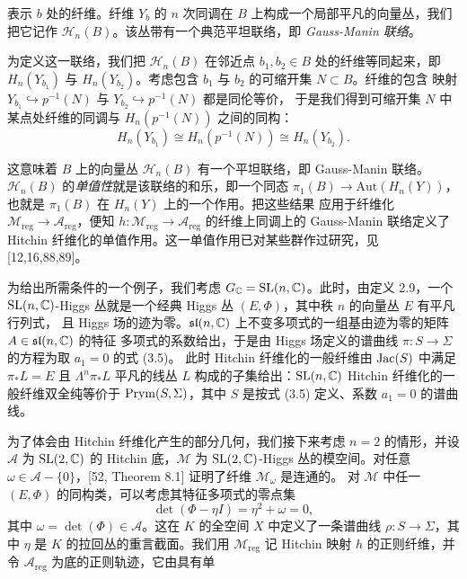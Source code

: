 
表示 $b$ 处的纤维。纤维 $Y_b$ 的 $n$ 次同调在 $B$ 上构成一个局部平凡的向量丛，我们把它记作
$\mathcal{H}_n(B)$。该丛带有一个典范平坦联络，即 \emph{Gauss-Manin 联络}。

为定义这一联络，我们把 $\mathcal{H}_n(B)$ 在邻近点 $b_1,b_2\in B$ 处的纤维等同起来，即
$H_n(Y_{b_1})$ 与 $H_n(Y_{b_2})$。考虑包含 $b_1$ 与 $b_2$ 的可缩开集 $N\subset B$。纤维的包含
映射 $Y_{b_1}\hookrightarrow p^{-1}(N)$ 与 $Y_{b_2}\hookrightarrow p^{-1}(N)$ 都是同伦等价，
于是我们得到可缩开集 $N$ 中某点处纤维的同调与 $H_n(p^{-1}(N))$ 之间的同构：
\[
H_n(Y_{b_1})\cong H_n(p^{-1}(N))\cong H_n(Y_{b_2}).
\]

这意味着 $B$ 上的向量丛 $\mathcal{H}_n(B)$ 有一个平坦联络，即 Gauss-Manin 联络。
$\mathcal{H}_n(B)$ 的\emph{单值性}就是该联络的和乐，即一个同态
$\pi_1(B)\to\mathrm{Aut}(H_n(Y))$，也就是 $\pi_1(B)$ 在 $H_n(Y)$ 上的一个作用。把这些结果
应用于纤维化 $\mathcal{M}_{\mathrm{reg}}\to\mathcal{A}_{\mathrm{reg}}$，便知
$h:\mathcal{M}_{\mathrm{reg}}\to\mathcal{A}_{\mathrm{reg}}$ 的纤维上同调上的 Gauss-Manin
联络定义了 Hitchin 纤维化的单值作用。这一单值作用已对某些群作过研究，见 [12,16,88,89]。


为给出所需条件的一个例子，我们考虑 $G_{\mathbb{C}}=\mathrm{SL}(n,\mathbb{C})$。此时，由定义 2.9，一个
$\mathrm{SL}(n,\mathbb{C})$-Higgs 丛就是一个经典 Higgs 丛 $(E,\Phi)$，其中秩 $n$ 的向量丛 $E$ 有平凡行列式，
且 Higgs 场的迹为零。$\mathfrak{sl}(n,\mathbb{C})$ 上不变多项式的一组基由迹为零的矩阵 $A\in\mathfrak{sl}(n,\mathbb{C})$ 的特征
多项式的系数给出，于是由 Higgs 场定义的谱曲线 $\pi:S\to\Sigma$ 的方程为取 $a_1=0$ 的式 (3.5)。
此时 Hitchin 纤维化的一般纤维由 $\operatorname{Jac}(S)$ 中满足 $\pi_*L=E$ 且 $\Lambda^n\pi_*L$ 平凡的线丛
$L$ 构成的子集给出：$\mathrm{SL}(n,\mathbb{C})$ Hitchin 纤维化的一般纤维双全纯等价于 $\operatorname{Prym}(S,\Sigma)$，其中
$S$ 是按式 (3.5) 定义、系数 $a_1=0$ 的谱曲线。

为了体会由 Hitchin 纤维化产生的部分几何，我们接下来考虑 $n=2$ 的情形，并设 $\mathcal{A}$ 为
$\mathrm{SL}(2,\mathbb{C})$ 的 Hitchin 底，$\mathcal{M}$ 为 $\mathrm{SL}(2,\mathbb{C})$-Higgs 丛的模空间。对任意
$\omega\in\mathcal{A}-\{0\}$，[52, Theorem 8.1] 证明了纤维 $\mathcal{M}_\omega$ 是连通的。
对 $\mathcal{M}$ 中任一 $(E,\Phi)$ 的同构类，可以考虑其特征多项式的零点集
\[
\det(\Phi-\eta I)=\eta^2+\omega=0,
\]
其中 $\omega=\det(\Phi)\in\mathcal{A}$。这在 $K$ 的全空间 $X$ 中定义了一条谱曲线
$\rho:S\to\Sigma$，其中 $\eta$ 是 $K$ 的拉回丛的重言截面。我们用 $\mathcal{M}_{\mathrm{reg}}$
记 Hitchin 映射 $h$ 的正则纤维，并令 $\mathcal{A}_{\mathrm{reg}}$ 为底的正则轨迹，它由具有单

